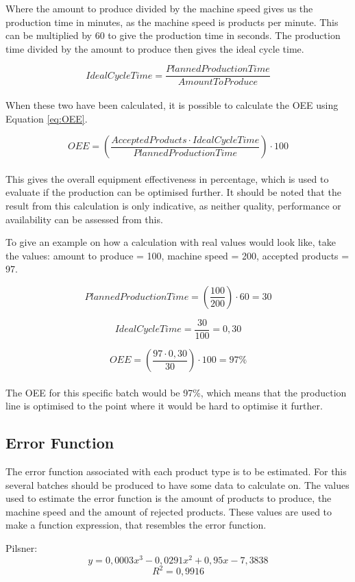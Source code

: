 Where the amount to produce divided by the machine speed gives us the production
time in minutes, as the machine speed is products per minute. This can be
multiplied by 60 to give the production time in seconds. The production time
divided by the amount to produce then gives the ideal cycle time.

\[IdealCycleTime = \frac{PlannedProductionTime}{AmountToProduce}\]\\

When these two have been calculated, it is possible to calculate the OEE using
Equation \ref{eq:OEE}.

\[OEE = \left(\frac{AcceptedProducts\cdot{IdealCycleTime}}{PlannedProductionTime}\right)\cdot100\]\\

This gives the overall equipment effectiveness in percentage, which is used to
evaluate if the production can be optimised further. It should be noted that
the result from this calculation is only indicative, as neither quality,
performance or availability can be assessed from this.

To give an example on how a calculation with real values would look like, take
the values: amount to produce = 100, machine speed = 200, accepted products = 97.

\[PlannedProductionTime = \left(\frac{100}{200}\right)\cdot60 = 30\]

\[IdealCycleTime = \frac{30}{100}=0,30\]

\[OEE = \left(\frac{97\cdot0,30}{30}\right)\cdot100 = 97\%\]\\

The OEE for this specific batch would be 97\%, which means that the production
line is optimised to the point where it would be hard to optimise it further.

\subsection{Error Function}
The error function associated with each product type is to be estimated. For
this several batches should be produced to have some data to calculate on. The
values used to estimate the error function is the amount of products to produce,
the machine speed and the amount of rejected products. These values are used to
make a function expression, that resembles the error function. 

Pilsner:\\
\[y = 0,0003x^3 - 0,0291x^2 + 0,95x - 7,3838\]
\[R^2 = 0,9916\]

